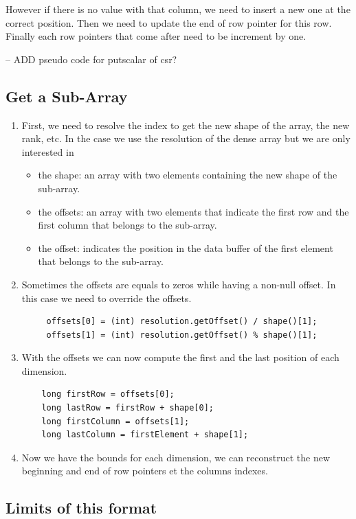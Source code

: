 However if there is no value with that column, we need to insert a new one at the correct position. Then we need to update the end of row pointer for this row. Finally each row pointers that come after need to be increment by one.

-- ADD pseudo code for putscalar of csr?



\subsection{Get a Sub-Array}

\begin{enumerate}
\item First, we need to resolve the index to get the new shape of the array, the new rank, etc. In the case we use the resolution of the dense array but we are only interested in
\begin{itemize}
	\item the shape: an array with two elements containing the new shape of the sub-array.
	\item the offsets: an array with two elements that indicate the first row and the first column that belongs to the sub-array.
	\item the offset: indicates the position in the data buffer of the first element that belongs to the sub-array.
\end{itemize}
 \item Sometimes the offsets are equals to zeros while having a non-null offset. In this case we need to override the offsets.
\begin{lstlisting}
	 offsets[0] = (int) resolution.getOffset() / shape()[1];
	 offsets[1] = (int) resolution.getOffset() % shape()[1];
\end{lstlisting}
\item With the offsets we can now compute the first and the last position of each dimension.
\begin{lstlisting}
	long firstRow = offsets[0];
	long lastRow = firstRow + shape[0];
	long firstColumn = offsets[1];
	long lastColumn = firstElement + shape[1];
\end{lstlisting}
\item Now we have the bounds for each dimension, we can reconstruct the new beginning and end of row pointers et the columns indexes.
\end{enumerate}


\subsection{Limits of this format}

